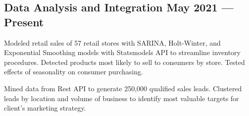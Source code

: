 \documentclass[letter,10pt]{article}
\begin{document}
\subsection{{Data Analysis and Integration  \hfill May 2021 --- Present}}
\begin{zitemize}
    \item{Modeled retail sales of 57 retail stores with SARINA, Holt-Winter, and Exponential Smoothing models with Statsmodels API to streamline inventory procedures. Detected products most likely to sell to consumers by store.  Tested effects of seasonality on consumer purchasing.}
    \item{Mined data from Rest API to generate 250,000 qualified sales leads. Clustered leads by location and volume of business to identify most valuable targets for client's marketing strategy.}
\end{zitemize}

\end{document}
